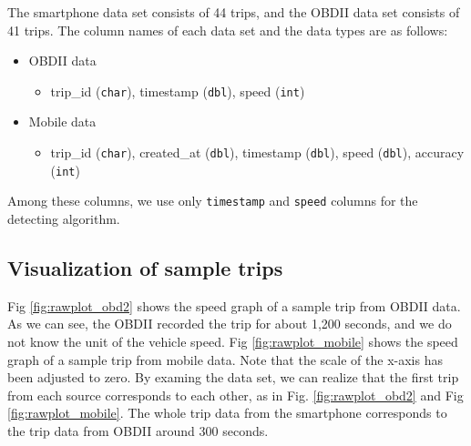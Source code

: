 \documentclass[letterpaper,9pt,twocolumn,twoside,]{pinp}
\providecommand{\tightlist}{%
  \setlength{\itemsep}{0pt}\setlength{\parskip}{0pt}}
\begin{document}
The smartphone data set consists of 44 trips, and the OBDII data set
consists of 41 trips. The column names of each data set and the data
types are as follows:

\begin{itemize}
\tightlist
\item
  OBDII data

  \begin{itemize}
  \tightlist
  \item
    trip\_id (\texttt{char}), timestamp (\texttt{dbl}), speed
    (\texttt{int})
  \end{itemize}
\item
  Mobile data

  \begin{itemize}
  \tightlist
  \item
    trip\_id (\texttt{char}), created\_at (\texttt{dbl}), timestamp
    (\texttt{dbl}), speed (\texttt{dbl}), accuracy (\texttt{int})
  \end{itemize}
\end{itemize}

Among these columns, we use only \texttt{timestamp} and \texttt{speed}
columns for the detecting algorithm.

\hypertarget{visualization-of-sample-trips}{%
\subsection{Visualization of sample
trips}\label{visualization-of-sample-trips}}

Fig \ref{fig:rawplot_obd2} shows the speed graph of a sample trip from
OBDII data. As we can see, the OBDII recorded the trip for about 1,200
seconds, and we do not know the unit of the vehicle speed. Fig
\ref{fig:rawplot_mobile} shows the speed graph of a sample trip from
mobile data. Note that the scale of the x-axis has been adjusted to
zero. By examing the data set, we can realize that the first trip from
each source corresponds to each other, as in Fig. \ref{fig:rawplot_obd2}
and Fig \ref{fig:rawplot_mobile}. The whole trip data from the
smartphone corresponds to the trip data from OBDII around 300 seconds.
\end{document}
